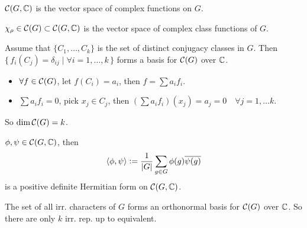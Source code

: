 \begin{definition}
  $\mathcal{C}(G, \mathbb{C})$ is the vector space of complex functions on $G$.

  $\chi_\rho \in \mathcal{C}(G) \subset \mathcal{C}(G, \mathbb{C})$
  is the vector space of complex class functions of $G$.
\end{definition}


\begin{remark}
  Assume that $\{ C_1, \dots, C_k \}$ is the set of distinct conjugacy classes
  in $G$.
  Then $\{\, f_i(C_j) = \delta_{ij} \mid \forall i = 1, \dots, k \,\}$ forms
  a basis for $\mathcal{C}(G)$ over $\mathbb{C}$.
  \begin{itemize}
    \item $\forall f \in \mathcal{C}(G)$, let $f(C_i) = a_i$, then
      $f = \sum a_i f_i$.
    \item $\sum a_i f_i = 0$, pick $x_j \in C_j$, then
      $(\sum a_if_i)(x_j) = a_j = 0 \quad \forall j = 1, \dots k$.
  \end{itemize}
  So $\dim \mathcal{C}(G) = k$.
\end{remark}

\begin{definition}
  $\phi, \psi \in \mathcal{C}(G, \mathbb{C})$, then
  \[ \langle\phi, \psi\rangle \vcentcolon= \frac{1}{\lvert G\rvert} \sum_{g\in G} \phi(g) \overline{\psi(g)} \]
  is a positive definite Hermitian form on $\mathcal{C}(G, \mathbb{C})$.
\end{definition}

\begin{theorem}
  The set of all irr. characters of $G$ forms an orthonormal basis for $\mathcal{C}(G)$
  over $\mathbb{C}$. So there are only $k$ irr. rep. up to equivalent.
\end{theorem}

